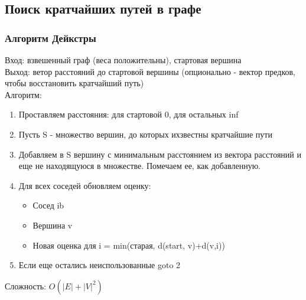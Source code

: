 \documentclass[a4paper]{article}
\begin{document}
\subsection{Поиск кратчайших путей в графе}
\subsubsection{Алгоритм Дейкстры}
Вход: взвешенный граф (веса положительны), стартовая вершина\\
Выход: ветор расстояний до стартовой вершины (опционально - вектор предков, чтобы восстановить кратчайший путь)\\
Алгоритм:
\begin{enumerate}
	\item Проставляем расстояния: для стартовой 0, для остальных inf
	\item Пусть S - множество вершин, до которых ихзвестны кратчайшие пути
	\item Добавляем в S вершину с минимальным расстоянием из вектора расстояний и еще не находящуюся в множестве. Помечаем ее, как добавленную.
	\item Для всех соседей обновляем оценку:
	\begin{itemize}
		\item  Сосед ib 
		\item Вершина v
		\item Новая оценка для i = min(старая, d(start, v)+d(v,i))
	\end{itemize}
	\item Если еще остались неиспользованные goto 2
\end{enumerate}
Сложность: $O(|E| + |V|^2)$
\end{document}
